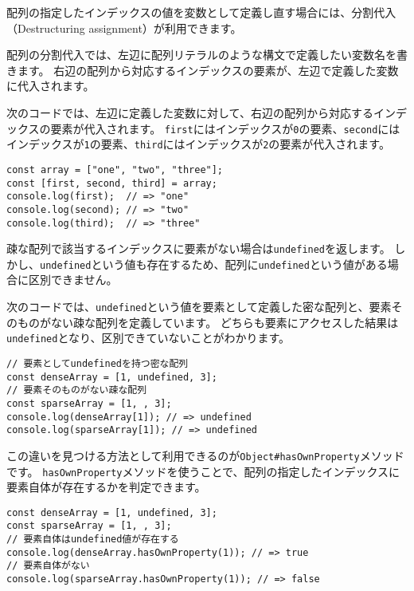 配列の指定したインデックスの値を変数として定義し直す場合には、分割代入（Destructuring
assignment）が利用できます。

配列の分割代入では、左辺に配列リテラルのような構文で定義したい変数名を書きます。
右辺の配列から対応するインデックスの要素が、左辺で定義した変数に代入されます。

次のコードでは、左辺に定義した変数に対して、右辺の配列から対応するインデックスの要素が代入されます。
\texttt{first}にはインデックスが\texttt{0}の要素、\texttt{second}にはインデックスが\texttt{1}の要素、\texttt{third}にはインデックスが\texttt{2}の要素が代入されます。

\begin{lstlisting}
const array = ["one", "two", "three"];
const [first, second, third] = array;
console.log(first);  // => "one"
console.log(second); // => "two"
console.log(third);  // => "three"
\end{lstlisting}

\begin{tcolorbox}[float,title=undefinedの要素と未定義の要素の違い]\label{diff-undefined-and-no-element}

疎な配列で該当するインデックスに要素がない場合は\texttt{undefined}を返します。
しかし、\texttt{undefined}という値も存在するため、配列に\texttt{undefined}という値がある場合に区別できません。

次のコードでは、\texttt{undefined}という値を要素として定義した密な配列と、要素そのものがない疎な配列を定義しています。
どちらも要素にアクセスした結果は\texttt{undefined}となり、区別できていないことがわかります。

\begin{lstlisting}
// 要素としてundefinedを持つ密な配列
const denseArray = [1, undefined, 3];
// 要素そのものがない疎な配列
const sparseArray = [1, , 3];
console.log(denseArray[1]); // => undefined
console.log(sparseArray[1]); // => undefined
\end{lstlisting}

この違いを見つける方法として利用できるのが\texttt{Object\#hasOwnProperty}メソッドです。
\texttt{hasOwnProperty}メソッドを使うことで、配列の指定したインデックスに要素自体が存在するかを判定できます。

\begin{lstlisting}
const denseArray = [1, undefined, 3];
const sparseArray = [1, , 3];
// 要素自体はundefined値が存在する
console.log(denseArray.hasOwnProperty(1)); // => true
// 要素自体がない
console.log(sparseArray.hasOwnProperty(1)); // => false
\end{lstlisting}
\end{tcolorbox}

